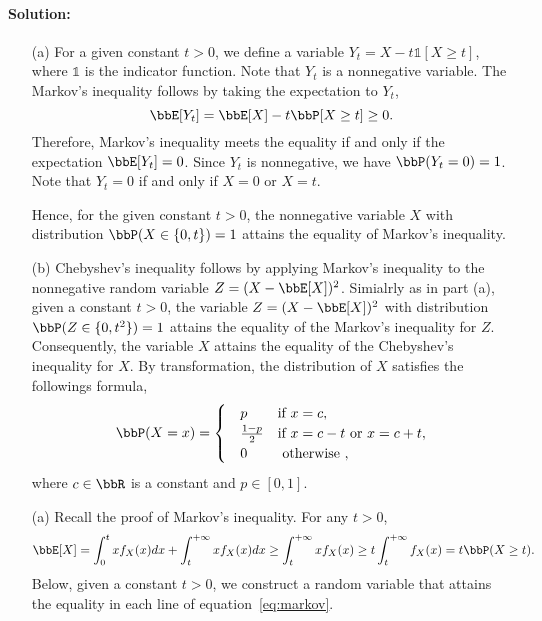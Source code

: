 \documentclass[11pt]{article}
\theoremstyle{plain}
\theoremstyle{definition}
\begin{document}
\paragraph{Solution:} 
\begin{enumerate}

\item[(a)] For a given constant $t >0$, we define a variable $Y_{t} = X - t \mathds{1}{[X\geq t]}$, where $\mathds{1}$ is the indicator function. Note that $Y_{t}$ is a nonnegative variable. The Markov's inequality follows by taking the expectation to $Y_t$,
\begin{equation}
	\bbE[Y_t] = \bbE[X] - t \bbP[X \geq t] \geq 0.
\end{equation}
Therefore, Markov's inequality meets the equality if and only if the expectation $\bbE[Y_t] = 0$. Since $Y_t$ is nonnegative, we have $\bbP(Y_t = 0) = 1$. Note that $Y_t = 0$ if and only if $X = 0$ or $X =t$.

Hence, for the given constant $t >0$, the nonnegative variable $X$ with distribution $\bbP(X \in \{ 0,t\}) = 1$ attains the equality of Markov's inequality.

\item[(b)]  Chebyshev's inequality follows by applying Markov's inequality to the nonnegative random variable $Z = {(X - \bbE[X])^2}$. Simialrly as in part (a), given a constant $t > 0$, the variable $Z = {(X - \bbE[X])^2}$ with distribution $\bbP(Z \in \{ 0,t^2 \}) = 1$ attains the equality of the Markov's inequality for $Z$. Consequently, the variable $X$ attains the equality of the Chebyshev's inequality for $X$. By transformation, the distribution of $X$ satisfies the followings formula,
\begin{align}
\bbP(X = x) = 
	\begin{cases}
		\quad p & \text{if } x = c,\\
		\quad \frac{1-p}{2} & \text{if } x = c-t \text{ or } x = c+t, \\
		\quad 0 & \text{ otherwise },
	\end{cases}
	\end{align}
where $c \in \bbR$ is a constant and $p \in [0,1]$.

\iffalse
	\item[(a)] Recall the proof of Markov's inequality. For any $t >0$,
	\begin{equation}\label{eq:markov}
		\bbE[X] = \int_{0}^t x f_X(x) dx + \int_{t}^{+\infty} x f_X(x) dx \geq \int_{t}^{+\infty} x f_X(x)\geq t \int_{t}^{+\infty} f_X(x) = t \bbP( X \geq t).
	\end{equation}
	Below, given a constant $t > 0$, we construct a random variable that attains the equality in each line of equation~\eqref{eq:markov}.
	 

\end{enumerate}
\end{document}
